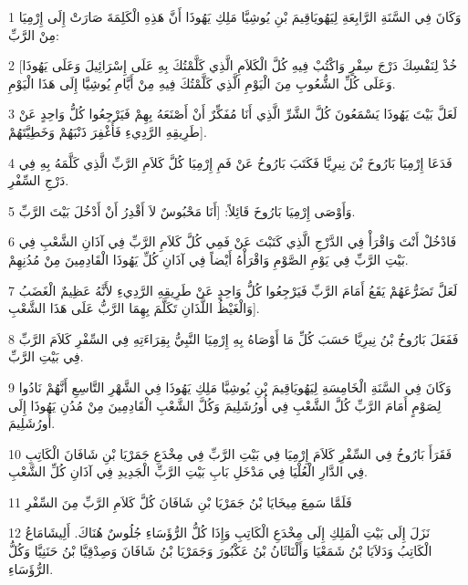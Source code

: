 \par 1 وَكَانَ فِي السَّنَةِ الرَّابِعَةِ لِيَهُويَاقِيمَ بْنِ يُوشِيَّا مَلِكِ يَهُوذَا أَنَّ هَذِهِ الْكَلِمَةَ صَارَتْ إِلَى إِرْمِيَا مِنْ الرَّبِّ:
\par 2 [خُذْ لِنَفْسِكَ دَرْجَ سِفْرٍ وَاكْتُبْ فِيهِ كُلَّ الْكَلاَمِ الَّذِي كَلَّمْتُكَ بِهِ عَلَى إِسْرَائِيلَ وَعَلَى يَهُوذَا وَعَلَى كُلِّ الشُّعُوبِ مِنَ الْيَوْمِ الَّذِي كَلَّمْتُكَ فِيهِ مِنْ أَيَّامِ يُوشِيَّا إِلَى هَذَا الْيَوْمِ.
\par 3 لَعَلَّ بَيْتَ يَهُوذَا يَسْمَعُونَ كُلَّ الشَّرِّ الَّذِي أَنَا مُفَكِّرٌ أَنْ أَصْنَعَهُ بِهِمْ فَيَرْجِعُوا كُلُّ وَاحِدٍ عَنْ طَرِيقِهِ الرَّدِيءِ فَأَغْفِرَ ذَنْبَهُمْ وَخَطِيَّتَهُمْ].
\par 4 فَدَعَا إِرْمِيَا بَارُوخَ بْنَ نِيرِيَّا فَكَتَبَ بَارُوخُ عَنْ فَمِ إِرْمِيَا كُلَّ كَلاَمِ الرَّبِّ الَّذِي كَلَّمَهُ بِهِ فِي دَرْجِ السِّفْرِ.
\par 5 وَأَوْصَى إِرْمِيَا بَارُوخَ قَائِلاً: [أَنَا مَحْبُوسٌ لاَ أَقْدِرُ أَنْ أَدْخُلَ بَيْتَ الرَّبِّ.
\par 6 فَادْخُلْ أَنْتَ وَاقْرَأْ فِي الدَّرْجِ الَّذِي كَتَبْتَ عَنْ فَمِي كُلَّ كَلاَمِ الرَّبِّ فِي آذَانِ الشَّعْبِ فِي بَيْتِ الرَّبِّ فِي يَوْمِ الصَّوْمِ وَاقْرَأْهُ أَيْضاً فِي آذَانِ كُلِّ يَهُوذَا الْقَادِمِينَ مِنْ مُدُنِهِمْ.
\par 7 لَعَلَّ تَضَرُّعَهُمْ يَقَعُ أَمَامَ الرَّبِّ فَيَرْجِعُوا كُلُّ وَاحِدٍ عَنْ طَرِيقِهِ الرَّدِيءِ لأَنَّهُ عَظِيمٌ الْغَضَبُ وَالْغَيْظُ اللَّذَانِ تَكَلَّمَ بِهِمَا الرَّبُّ عَلَى هَذَا الشَّعْبِ].
\par 8 فَفَعَلَ بَارُوخُ بْنُ نِيرِيَّا حَسَبَ كُلِّ مَا أَوْصَاهُ بِهِ إِرْمِيَا النَّبِيُّ بِقِرَاءَتِهِ فِي السِّفْرِ كَلاَمَ الرَّبِّ فِي بَيْتِ الرَّبِّ.
\par 9 وَكَانَ فِي السَّنَةِ الْخَامِسَةِ لِيَهُويَاقِيمَ بْنِ يُوشِيَّا مَلِكِ يَهُوذَا فِي الشَّهْرِ التَّاسِعِ أَنَّهُمْ نَادُوا لِصَوْمٍ أَمَامَ الرَّبِّ كُلَّ الشَّعْبِ فِي أُورُشَلِيمَ وَكُلَّ الشَّعْبِ الْقَادِمِينَ مِنْ مُدُنِ يَهُوذَا إِلَى أُورُشَلِيمَ.
\par 10 فَقَرَأَ بَارُوخُ فِي السِّفْرِ كَلاَمَ إِرْمِيَا فِي بَيْتِ الرَّبِّ فِي مِخْدَعِ جَمَرْيَا بْنِ شَافَانَ الْكَاتِبِ فِي الدَّارِ الْعُلْيَا فِي مَدْخَلِ بَابِ بَيْتِ الرَّبِّ الْجَدِيدِ فِي آذَانِ كُلِّ الشَّعْبِ.
\par 11 فَلَمَّا سَمِعَ مِيخَايَا بْنُ جَمَرْيَا بْنِ شَافَانَ كُلَّ كَلاَمِ الرَّبِّ مِنَ السِّفْرِ
\par 12 نَزَلَ إِلَى بَيْتِ الْمَلِكِ إِلَى مِخْدَعِ الْكَاتِبِ وَإِذَا كُلُّ الرُّؤَسَاءِ جُلُوسٌ هُنَاكَ. أَلِيشَامَاعُ الْكَاتِبُ وَدَلاَيَا بْنُ شَمَعْيَا وَأَلْنَاثَانُ بْنُ عَكْبُورَ وَجَمَرْيَا بْنُ شَافَانَ وَصِدْقِيَّا بْنُ حَنَنِيَّا وَكُلُّ الرُّؤَسَاءِ.
